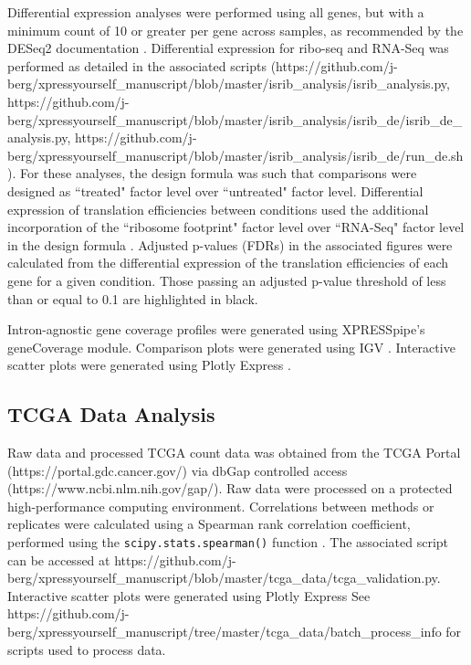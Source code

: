 \documentclass[10pt, oneside]{article}
\begin{document}
Differential expression analyses were performed using all genes, but with a minimum count of 10 or greater per gene across samples, as recommended by the DESeq2 documentation \cite{deseq2}. Differential expression for ribo-seq and RNA-Seq was performed as detailed in the associated scripts (https://github.com/j-berg/xpressyourself\_manuscript/blob/master/isrib\_analysis/isrib\_analysis.py, https://github.com/j-berg/xpressyourself\_manuscript/blob/master/isrib\_analysis/isrib\_de/isrib\_de\_analysis.py, https://github.com/j-berg/xpressyourself\_manuscript/blob/master/isrib\_analysis/isrib\_de/run\_de.sh). For these analyses, the design formula was such that comparisons were designed as ``treated" factor level over ``untreated" factor level. Differential expression of translation efficiencies between conditions used the additional incorporation of the ``ribosome footprint" factor level over ``RNA-Seq" factor level in the design formula \cite{deseq2,isrib_riboseq,ingolia_meth}. Adjusted p-values (FDRs) in the associated figures were calculated from the differential expression of the translation efficiencies of each gene for a given condition. Those passing an adjusted p-value threshold of less than or equal to 0.1 are highlighted in black. \par

Intron-agnostic gene coverage profiles were generated using XPRESSpipe's geneCoverage module. Comparison plots were generated using IGV \cite{igv}. Interactive scatter plots were generated using Plotly Express \cite{plotly}. \par

\subsection{TCGA Data Analysis}
Raw data and processed TCGA count data was obtained from the TCGA Portal (https://portal.gdc.cancer.gov/) via dbGap controlled access (https://www.ncbi.nlm.nih.gov/gap/). Raw data were processed on a protected high-performance computing environment. Correlations between methods or replicates were calculated using a Spearman rank correlation coefficient, performed using the \texttt{scipy.stats.spearman()} function \cite{spearman_rnaseq}. The associated script can be accessed at https://github.com/j-berg/xpressyourself\_manuscript/blob/master/tcga\_data/tcga\_validation.py. Interactive scatter plots were generated using Plotly Express \cite{plotly} See https://github.com/j-berg/xpressyourself\_manuscript/tree/master/tcga\_data/batch\_process\_info for scripts used to process data. \par
\end{document}
